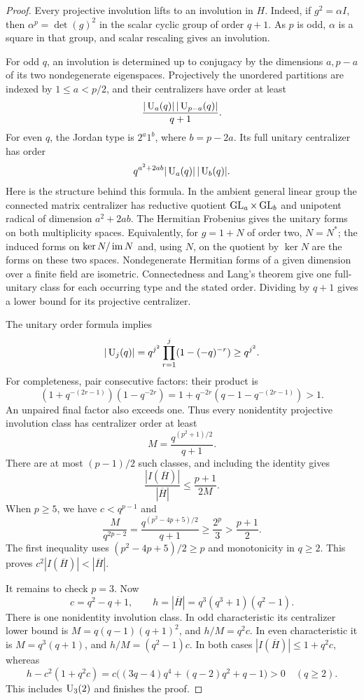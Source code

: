 \begin{proof}
Every projective involution lifts to an involution in $H$. Indeed,
if $g^2=\alpha I$, then $\alpha^p=\det(g)^2$ in the scalar cyclic
group of order $q+1$. As $p$ is odd, $\alpha$ is a square in that
group, and scalar rescaling gives an involution.

For odd $q$, an involution is determined up to conjugacy by the
dimensions $a,p-a$ of its two nondegenerate eigenspaces. Projectively
the unordered partitions are indexed by $1\le a<p/2$, and their
centralizers have order at least
\begin{equation}\label{eq:finite-unitary-odd-centralizer}
 \frac{|\operatorname{U}_a(q)|\,|\operatorname{U}_{p-a}(q)|}{q+1}.
\end{equation}
For even $q$, the Jordan type is $2^a1^b$, where $b=p-2a$. Its full
unitary centralizer has order
\begin{equation}\label{eq:finite-unitary-even-centralizer}
 q^{a^2+2ab}|\operatorname{U}_a(q)|\,|\operatorname{U}_b(q)|.
\end{equation}
Here is the structure behind this formula. In the ambient general
linear group the connected matrix centralizer has reductive quotient
$\operatorname{GL}_a\times\operatorname{GL}_b$ and unipotent radical of dimension $a^2+2ab$.
The Hermitian Frobenius gives the unitary forms on both multiplicity
spaces. Equivalently, for $g=1+N$ of order two, $N=N^*$; the induced
forms on $\ker N/\operatorname{im} N$ and, using $N$, on the quotient by $\ker N$
are the forms on these two spaces. Nondegenerate Hermitian forms of
a given dimension over a finite field are isometric. Connectedness
and Lang's theorem give one full-unitary class for each occurring
type and the stated order. Dividing by $q+1$ gives a lower bound
for its projective centralizer.

The unitary order formula implies
\begin{equation}\label{eq:finite-unitary-order-lower}
 |\operatorname{U}_j(q)|=q^{j^2}\prod_{r=1}^j(1-(-q)^{-r})\ge q^{j^2}.
\end{equation}
For completeness, pair consecutive factors: their product is
\[
 (1+q^{-(2r-1)})(1-q^{-2r})
 =1+q^{-2r}(q-1-q^{-(2r-1)})>1.
\]
An unpaired final factor also exceeds one. Thus every nonidentity
projective involution class has centralizer order at least
\[
 M=\frac{q^{(p^2+1)/2}}{q+1}.
\]
There are at most $(p-1)/2$ such classes, and including the identity
gives
\[
 \frac{|I(\overline H)|}{|\overline H|}\le\frac{p+1}{2M}.
\]
When $p\ge5$, we have $c<q^{p-1}$ and
\[
 \frac{M}{q^{2p-2}}
 =\frac{q^{(p^2-4p+5)/2}}{q+1}
 \ge\frac{2^p}{3}>\frac{p+1}{2}.
\]
The first inequality uses $(p^2-4p+5)/2\ge p$ and monotonicity in
$q\ge2$. This proves $c^2|I(\overline H)|<|\overline H|$.

It remains to check $p=3$. Now
\[
 c=q^2-q+1,\qquad h=|\overline H|=q^3(q^3+1)(q^2-1).
\]
There is one nonidentity involution class. In odd characteristic its
centralizer lower bound is $M=q(q-1)(q+1)^2$, and $h/M=q^2c$.
In even characteristic it is $M=q^3(q+1)$, and $h/M=(q^2-1)c$.
In both cases $|I(\overline H)|\le1+q^2c$, whereas
\[
 h-c^2(1+q^2c)
 =c\bigl((3q-4)q^4+(q-2)q^2+q-1\bigr)>0
 \quad(q\ge2).
\]
This includes $\operatorname{U}_3(2)$ and finishes the proof.
\end{proof}

